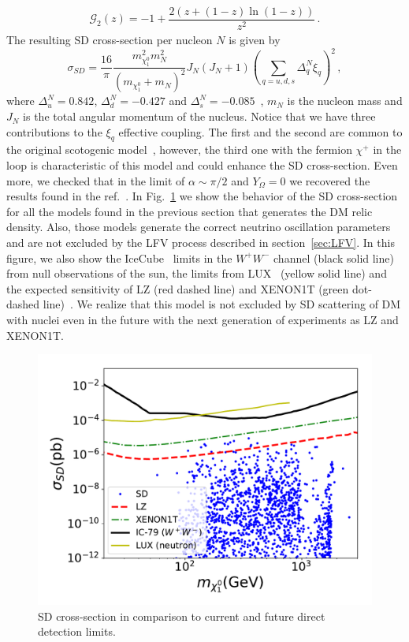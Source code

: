 \documentclass[12pt,letterpaper]{article}
\begin{document}
\begin{align}
\label{eq:G2}
\mathcal{G}_2(z) = -1 + \dfrac{2(z+(1-z)\ln(1-z))}{z^2}\,.
\end{align}
The resulting SD cross-section per nucleon  $N$  is given by
\begin{equation}
\label{eq:SD}
\sigma_{SD}=\dfrac{16}{\pi}\dfrac{m_{\chi^0_1}^2m_N^2}{(m_{\chi^0_1}+m_N)^2}J_N(J_N+1)\left(\sum_{q=u,d,s}\Delta_q^N \xi_q\right)^2 \,,
\end{equation}
where $\Delta_u^N=0.842$, $\Delta_d^N= -0.427$ and $\Delta_s^N= -0.085$~\cite{Airapetian:2006vy}, $m_N$ is the nucleon mass and $J_N$ is the  total angular momentum of the nucleus. 
Notice that we have three contributions to the $\xi_q$ effective coupling. 
The first and the second are common to the original scotogenic model~\cite{Ma:2006km}, however, the third one with the fermion $\chi^{+}$ in the loop is characteristic of this model and could enhance the SD cross-section. Even more, we checked that in the limit of $\alpha\sim\pi/2$ and $Y_{\Omega}=0$ we recovered the results found in the ref.~\cite{Ibarra:2016dlb}.
In Fig.~\ref{fig:SD-scan} we show the behavior of the SD cross-section for all the models found in the previous section that generates the DM relic density.  Also, those models generate the correct neutrino oscillation parameters and are not excluded by the LFV process described in section~\ref{sec:LFV}. 
In this figure, we also show the IceCube~\cite{2013PhRvL.110m1302A} limits in the $W^+W^-$ channel (black solid line) from null observations of the sun, the limits from LUX~\cite{Akerib:2016lao} (yellow solid line) and the expected sensitivity of LZ (red dashed line) and XENON1T (green dot-dashed line)~\cite{Cushman:2013zza}.
We realize that this model is not excluded by SD scattering of DM with nuclei even in the future with the next generation of experiments as LZ and XENON1T.
\begin{figure}[h]
\begin{center}
\includegraphics[scale=0.5]{sigmaSD_with_neutrino_physics}
\caption{SD cross-section  in comparison to current and future direct detection limits. }
\label{fig:SD-scan}
\end{center}
\end{figure}
\end{document}
